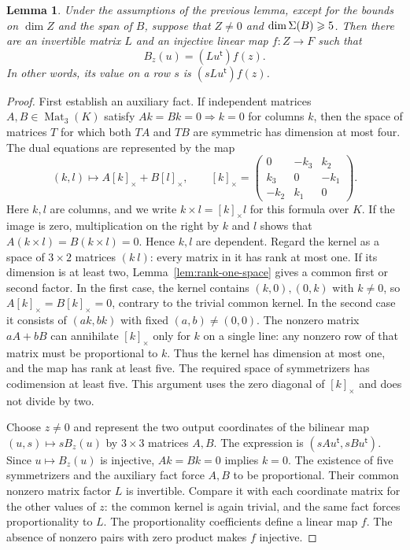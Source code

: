 \documentclass[11pt,a4paper]{article}
\numberwithin{equation}{section}
\theoremstyle{plain}
\newtheorem{lemma}[theorem]{Lemma}
\theoremstyle{definition}
\DeclareMathOperator{\Mat}{Mat}\DeclareMathOperator{\Span}{span}
\begin{document}
\begin{lemma}\label{lem:five-sym}
Under the assumptions of the previous lemma, except for the bounds on
$\dim Z$ and the span of $B$, suppose that $Z\ne0$ and
$\dim\Sigma(B)\geqslant5$. Then there are an invertible matrix $L$ and an
injective linear map $f:Z\to F$ such that
\begin{equation}\label{eq:factor}
 B_z(u)= (Lu^{\mathsf t}) f(z).
\end{equation}
In other words, its value on a row $s$ is $(sLu^{\mathsf t})f(z)$.
\end{lemma}
\begin{proof}
First establish an auxiliary fact. If independent matrices
$A,B\in\Mat_3(K)$ satisfy $Ak=Bk=0\Rightarrow k=0$ for columns $k$,
then the space of matrices $T$ for which both $TA$ and $TB$ are
symmetric has dimension at most four. The dual equations are
represented by the map
\[
 (k,l)\longmapsto A[k]_\times+B[l]_\times,\qquad
 [k]_\times=\begin{pmatrix}0&-k_3&k_2\\k_3&0&-k_1\\-k_2&k_1&0\end{pmatrix}.
\]
Here $k,l$ are columns, and we write $k\times l=[k]_\times l$ for this
formula over $K$. If the image is zero, multiplication on the right by
$k$ and $l$ shows that $A(k\times l)=B(k\times l)=0$.
Hence $k,l$ are dependent. Regard the kernel as a space of
$3\times2$ matrices $(k\ l)$: every matrix in it has rank at most one.
If its dimension is at least two, Lemma~\ref{lem:rank-one-space} gives
a common first or second factor. In the first case, the kernel contains
$(k,0),(0,k)$ with $k\ne0$, so $A[k]_\times=B[k]_\times=0$, contrary
to the trivial common kernel. In the second case it consists of
$(ak,bk)$ with fixed $(a,b)\ne(0,0)$. The nonzero matrix $aA+bB$
can annihilate $[k]_\times$ only for $k$ on a single line: any nonzero
row of that matrix must be proportional to $k$.
Thus the kernel has dimension at most one, and the map has rank at
least five. The required space of symmetrizers has codimension at
least five. This argument uses the zero diagonal of $[k]_\times$
and does not divide by two.

Choose $z\ne0$ and represent the two output coordinates of the
bilinear map $(u,s)\mapsto sB_z(u)$ by $3\times3$ matrices $A,B$.
The expression is $(sAu^{\mathsf t},sBu^{\mathsf t})$.
Since $u\mapsto B_z(u)$ is injective, $Ak=Bk=0$ implies $k=0$.
The existence of five symmetrizers and the auxiliary fact force $A,B$
to be proportional. Their common nonzero matrix factor $L$ is
invertible. Compare it with each coordinate matrix for the other
values of $z$: the common kernel is again trivial, and the same fact
forces proportionality to $L$. The proportionality coefficients
define a linear map $f$. The absence of nonzero pairs with zero
product makes $f$ injective.
\end{proof}
\end{document}
